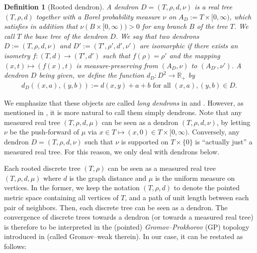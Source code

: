 \documentclass{article}
\newtheorem{definition}[theorem]{Definition}
\theoremstyle{remark}
\begin{document}
\begin{definition}[Rooted dendron]
\label{def:dendron}
A dendron $D=(T,\rho,d,\nu)$ is a real tree $(T,\rho,d)$ together with a Borel probability measure $\nu$ on $A_D := T \times [0,\infty)$, which satisfies in addition that $\nu(B \times [0,\infty))>0$ for any branch $B$ of the tree $T$.
We call $T$ the \emph{base tree} of the dendron $D$.
We say that two dendrons $D := (T,\rho,d,\nu)$ and $D' := (T',\rho',d',\nu')$ are isomorphic if there exists an isometry $f: (T,d) \to (T',d')$ such that $f(\rho)=\rho'$ and the mapping $(x,t) \mapsto (f(x),t)$ is measure-preserving from $(A_D,\nu)$ to $(A_{D'},\nu')$.
A dendron $D$ being given, we define the function $d_D: D^2 \rightarrow \mathbb{R}_+$ by
\begin{align*}
    d_D((x,a),(y,b)) := d(x,y)+a+b \text{ for all } (x,a),(y,b) \in D.
\end{align*}
\end{definition}

We emphasize that these objects are called \textit{long dendrons} in \cite{ET22} and \cite{Janson21}. 
However, as mentioned in \cite[Remark 3.8]{Janson21}, it is more natural to call them simply dendrons.
Note that any measured real tree $(T,\rho,d,\mu)$ can be seen as a dendron $(T,\rho,d,\nu)$, by letting $\nu$ be the push-forward of $\mu$ via $x\in T \mapsto (x,0) \in T\times[0,\infty)$.
Conversely, any dendron $D=(T,\rho,d,\nu)$ such that $\nu$ is supported on $T\times\{0\}$ is \enquote{actually just} a measured real tree.
For this reason, we only deal with dendrons below.

Each rooted discrete tree $(T,\rho)$ can be seen as a measured real tree $(T,\rho,d,\mu)$ where $d$ is the graph distance and $\mu$ is the uniform measure on vertices.
In the former, we keep the notation $(T,\rho,d)$ to denote the pointed metric space containing all vertices of $T$, and a path of unit length between each pair of neighbors.
Then, each discrete tree can be seen as a dendron.
The convergence of discrete trees towards a dendron (or towards a measured real tree) is therefore to be interpreted in the (pointed) \emph{Gromov--Prokhorov} (GP) topology introduced in \cite{Greven_Pfaffelhuber_Winter_2009} (called Gromov--weak therein).
In our case, it can be restated as follows:
\end{document}
